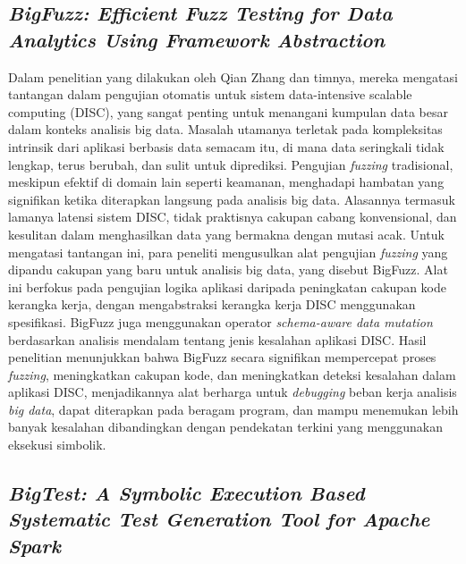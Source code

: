 \subsection{\emph{BigFuzz: Efficient Fuzz Testing for Data Analytics Using Framework Abstraction}}
\label{subsec:BigFuzz: Efficient Fuzz Testing for Data Analytics Using Framework Abstraction}

Dalam penelitian yang dilakukan oleh Qian Zhang dan timnya, mereka mengatasi tantangan dalam pengujian otomatis untuk sistem data-intensive scalable computing (DISC), yang sangat penting untuk menangani kumpulan data besar dalam konteks analisis big data. Masalah utamanya terletak pada kompleksitas intrinsik dari aplikasi berbasis data semacam itu, di mana data seringkali tidak lengkap, terus berubah, dan sulit untuk diprediksi. Pengujian \emph{fuzzing} tradisional, meskipun efektif di domain lain seperti keamanan, menghadapi hambatan yang signifikan ketika diterapkan langsung pada analisis big data. Alasannya termasuk lamanya latensi sistem DISC, tidak praktisnya cakupan cabang konvensional, dan kesulitan dalam menghasilkan data yang bermakna dengan mutasi acak. Untuk mengatasi tantangan ini, para peneliti mengusulkan alat pengujian \emph{fuzzing} yang dipandu cakupan yang baru untuk analisis big data, yang disebut BigFuzz. Alat ini berfokus pada pengujian logika aplikasi daripada peningkatan cakupan kode kerangka kerja, dengan mengabstraksi kerangka kerja DISC menggunakan spesifikasi. BigFuzz juga menggunakan operator \emph{schema-aware data mutation} berdasarkan analisis mendalam tentang jenis kesalahan aplikasi DISC. Hasil penelitian menunjukkan bahwa BigFuzz secara signifikan mempercepat proses \emph{fuzzing}, meningkatkan cakupan kode, dan meningkatkan deteksi kesalahan dalam aplikasi DISC, menjadikannya alat berharga untuk \emph{debugging} beban kerja analisis \emph{big data}, dapat diterapkan pada beragam program, dan mampu menemukan lebih banyak kesalahan dibandingkan dengan pendekatan terkini yang menggunakan eksekusi simbolik.

\subsection{\emph{BigTest: A Symbolic Execution Based Systematic Test Generation Tool for Apache Spark}}
\label{subsec:BigTest: A Symbolic Execution Based Systematic Test Generation Tool for Apache Spark}

